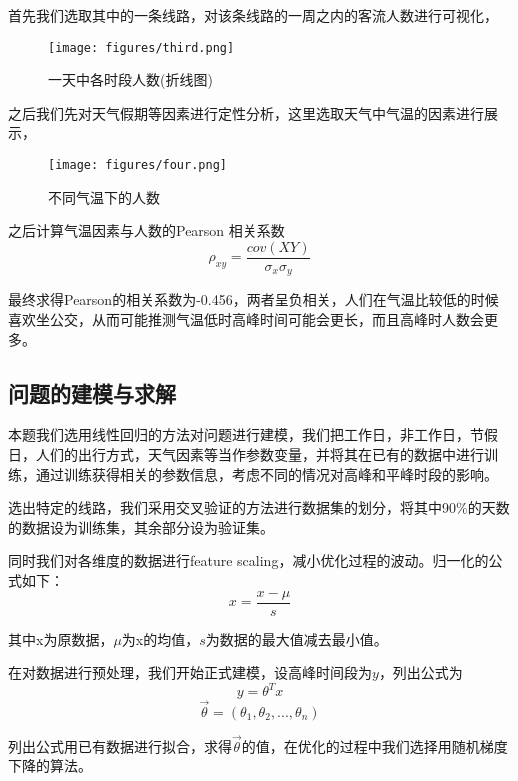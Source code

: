 \documentclass[UTF8]{ctexart}
\begin{document}
	首先我们选取其中的一条线路，对该条线路的一周之内的客流人数进行可视化，
	
	\begin{figure}[H]
		\centering
		\texttt{[image: figures/third.png]}
		\caption {一天中各时段人数(折线图)}
	\end{figure}
	
	之后我们先对天气假期等因素进行定性分析，这里选取天气中气温的因素进行展示，
	
	\begin{figure}[H]
		\centering
		\texttt{[image: figures/four.png]}
		\caption {不同气温下的人数}
	\end{figure}
	
	之后计算气温因素与人数的Pearson 相关系数
	\begin{equation}
	\rho_{xy}=\frac{cov(XY)}{\sigma_x \sigma_y}
	\end{equation}
	
	最终求得Pearson的相关系数为-0.456，两者呈负相关，人们在气温比较低的时候喜欢坐公交，从而可能推测气温低时高峰时间可能会更长，而且高峰时人数会更多。
	
	\subsection{问题的建模与求解}
	本题我们选用线性回归的方法对问题进行建模，我们把工作日，非工作日，节假日，人们的出行方式，天气因素等当作参数变量，并将其在已有的数据中进行训练，通过训练获得相关的参数信息，考虑不同的情况对高峰和平峰时段的影响。
	
	选出特定的线路，我们采用交叉验证的方法进行数据集的划分，将其中90$\%$的天数的数据设为训练集，其余部分设为验证集。
	
	同时我们对各维度的数据进行feature scaling，减小优化过程的波动。归一化的公式如下：
	\begin{equation}
	x=\frac{x-\mu}{s}
	\end{equation}
	
	其中x为原数据，$\mu$为x的均值，$s$为数据的最大值减去最小值。
	
	在对数据进行预处理，我们开始正式建模，设高峰时间段为$y$，列出公式为
	\begin{equation}
	y=\theta^T x
	\end{equation}
	\begin{equation}
	\Vec{\theta}=(\theta_1,\theta_2,...,\theta_n) 
	\end{equation}
	
	列出公式用已有数据进行拟合，求得$\Vec{\theta}$的值，在优化的过程中我们选择用随机梯度下降的算法。
	
\end{document}
